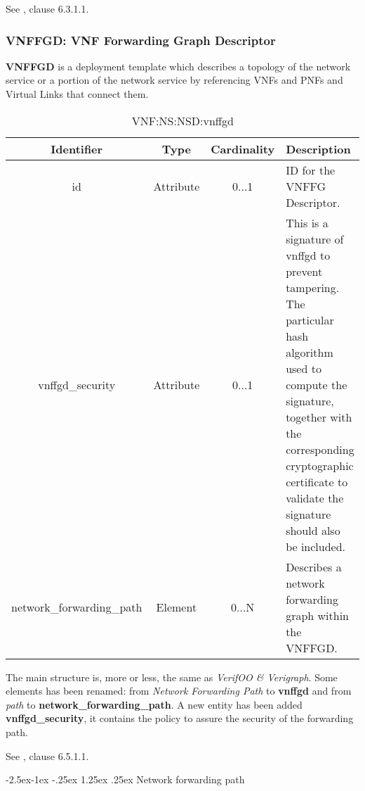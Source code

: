 \documentclass[11pt, english]{article}
\makeatletter
\renewcommand\paragraph{\@startsection{paragraph}{4}{\z@}%
            {-2.5ex\@plus -1ex \@minus -.25ex}%
            {1.25ex \@plus .25ex}%
            {\normalfont\normalsize\bfseries}}
\makeatother
\begin{document}
See \cite{etsi}, clause 6.3.1.1.

\newpage
\subsubsection{VNFFGD: VNF Forwarding Graph Descriptor}
\textbf{VNFFGD} is a deployment template which describes a topology of the network service or a portion of the network service by referencing VNFs and PNFs and Virtual Links that connect them.

\begin{table}[ht]
    \centering
    \begin{tabular}{c|c|c|m{7cm}}
    \hline
    Identifier & Type & Cardinality & Description \\
    \hline
    \rowcolor{Gray}
    id & Attribute & 0...1 & ID for the VNFFG Descriptor. \\
    \hline
    vnffgd\_security & Attribute & 0...1 & This is a signature of vnffgd to prevent tampering. The particular hash algorithm used to compute the signature, together with the corresponding cryptographic certificate to validate the signature should also be included. \\
    \hline
    \rowcolor{Gray}
    network\_forwarding\_path & Element & 0...N & Describes a network forwarding graph within the VNFFGD. \\
    \hline
    \end{tabular}
    \caption{VNF:NS:NSD:vnffgd} \label{tab:tab10}
\end{table}

The main structure is, more or less, the same as \emph{VerifOO \& Verigraph}. Some elements has been renamed: from \textit{Network Forwarding Path} to \textbf{vnffgd} and from \textit{path} to \textbf{network\_forwarding\_path}. A new entity has been added \textbf{vnffgd\_security}, it contains the policy to assure the security of the forwarding path.

See \cite{etsi}, clause 6.5.1.1.

\paragraph{Network forwarding path}
\end{document}
